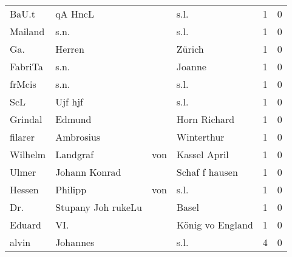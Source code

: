 \begin{tabular}{llllrr}
                    BaU.t &                            qA HncL &             &                                        s.l. &          1 &         0 \\
                  Mailand &                               s.n. &             &                                        s.l. &          1 &         0 \\
                      Ga. &                             Herren &             &                                      Zürich &          1 &         0 \\
                  FabriTa &                               s.n. &             &                                      Joanne &          1 &         0 \\
                   frMcis &                               s.n. &             &                                        s.l. &          1 &         0 \\
                      ScL &                            Ujf hjf &             &                                        s.l. &          1 &         0 \\
                  Grindal &                             Edmund &             &                                Horn Richard &          1 &         0 \\
                  filarer &                          Ambrosius &             &                                  Winterthur &          1 &         0 \\
                  Wilhelm &                           Landgraf &         von &                                Kassel April &          1 &         0 \\
                    Ulmer &                      Johann Konrad &             &                              Schaf f hausen &          1 &         0 \\
                   Hessen &                            Philipp &         von &                                        s.l. &          1 &         0 \\
                      Dr. &                 Stupany Joh rukeLu &             &                                       Basel &          1 &         0 \\
                   Eduard &                                VI. &             &                            König vo England &          1 &         0 \\
                    alvin &                           Johannes &             &                                        s.l. &          4 &         0 \\

\end{tabular}
